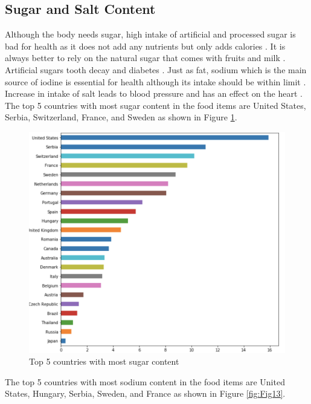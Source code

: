 \documentclass[sigconf]{acmart}
\begin{document}
\subsection{Sugar and Salt Content}
Although the body needs sugar, high intake of artificial and processed sugar is bad for health as it does not add any nutrients but only adds calories \cite{www-sugar}. It is always better to rely on the natural sugar that comes with fruits and milk \cite{www-sugar}. Artificial sugars tooth decay and diabetes \cite{www-sugar}. Just as fat, sodium which is the main source of iodine is essential for health although its intake should be within limit \cite{www-sugar}. Increase in intake of salt leads to blood pressure and has an effect on the heart \cite{www-sugar}. \\

The top 5 countries with most sugar content in the food items are United States, Serbia, Switzerland, France, and Sweden as shown in Figure \ref{fig:Fig12}. \\
    
\begin{figure}
\includegraphics[width=1.0\columnwidth]{images/fig12.png}
\caption{Top 5 countries with most sugar content \cite{code-base}}
\label{fig:Fig12}
\end{figure} 

The top 5 countries with most sodium content in the food items are United States, Hungary, Serbia, Sweden, and France as shown in Figure \ref{fig:Fig13}. \\
    
\end{document}
